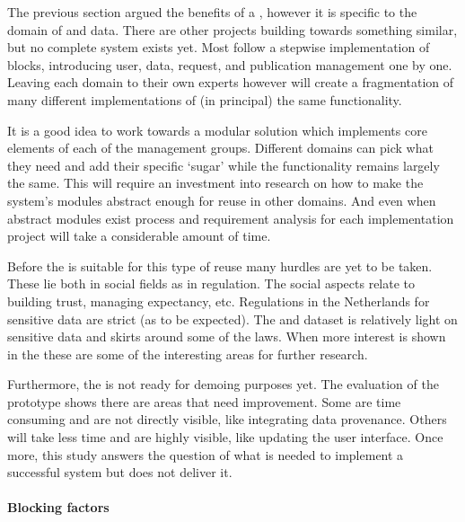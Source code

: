 The previous section argued the benefits of a \ivfsystem{}, however it is specific to the domain of \IVF{} and \PRN{} data.
There are other projects building towards something similar, but no complete system exists yet.
Most follow a stepwise implementation of blocks, introducing user, data, request, and publication management one by one.
Leaving each domain to their own experts however will create a fragmentation of many different implementations of (in principal) the same functionality.

It is a good idea to work towards a modular solution which implements core elements of each of the management groups.
Different domains can pick what they need and add their specific `sugar' while the functionality remains largely the same.
This will require an investment into research on how to make the system's modules abstract enough for reuse in other domains.
And even when abstract modules exist process and requirement analysis for each implementation project will take a considerable amount of time.

Before the \ivfsystem{} is suitable for this type of reuse many hurdles are yet to be taken.
These lie both in social fields as in regulation.
The social aspects relate to building trust, managing expectancy, etc.
Regulations in the Netherlands for sensitive data are strict (as to be expected).
The \IVF{} and \PRN{} dataset is relatively light on sensitive data and skirts around some of the laws.
When more interest is shown in the \ivfsystem{} these are some of the interesting areas for further research.

Furthermore, the \ivfsystem{} is not ready for demoing purposes yet.
The evaluation of the prototype shows there are areas that need improvement.
Some are time consuming and are not directly visible, like integrating data provenance.
Others will take less time and are highly visible, like updating the user interface.
Once more, this study answers the question of what is needed to implement a successful system but does not deliver it.

\paragraph{Blocking factors}



